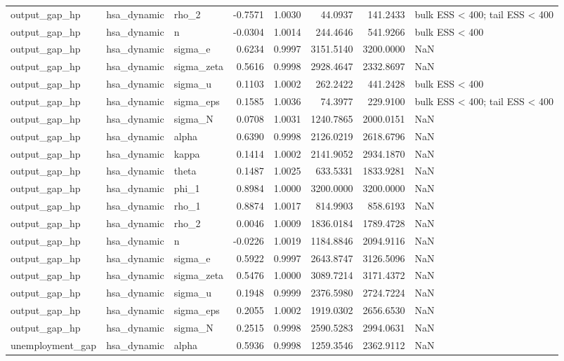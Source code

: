 \begin{tabular}{lllrrrrl}
output\_gap\_hp & hsa\_dynamic & rho\_2 & -0.7571 & 1.0030 & 44.0937 & 141.2433 & bulk ESS < 400; tail ESS < 400 \\
output\_gap\_hp & hsa\_dynamic & n & -0.0304 & 1.0014 & 244.4646 & 541.9266 & bulk ESS < 400 \\
output\_gap\_hp & hsa\_dynamic & sigma\_e & 0.6234 & 0.9997 & 3151.5140 & 3200.0000 & NaN \\
output\_gap\_hp & hsa\_dynamic & sigma\_zeta & 0.5616 & 0.9998 & 2928.4647 & 2332.8697 & NaN \\
output\_gap\_hp & hsa\_dynamic & sigma\_u & 0.1103 & 1.0002 & 262.2422 & 441.2428 & bulk ESS < 400 \\
output\_gap\_hp & hsa\_dynamic & sigma\_eps & 0.1585 & 1.0036 & 74.3977 & 229.9100 & bulk ESS < 400; tail ESS < 400 \\
output\_gap\_hp & hsa\_dynamic & sigma\_N & 0.0708 & 1.0031 & 1240.7865 & 2000.0151 & NaN \\
output\_gap\_hp & hsa\_dynamic & alpha & 0.6390 & 0.9998 & 2126.0219 & 2618.6796 & NaN \\
output\_gap\_hp & hsa\_dynamic & kappa & 0.1414 & 1.0002 & 2141.9052 & 2934.1870 & NaN \\
output\_gap\_hp & hsa\_dynamic & theta & 0.1487 & 1.0025 & 633.5331 & 1833.9281 & NaN \\
output\_gap\_hp & hsa\_dynamic & phi\_1 & 0.8984 & 1.0000 & 3200.0000 & 3200.0000 & NaN \\
output\_gap\_hp & hsa\_dynamic & rho\_1 & 0.8874 & 1.0017 & 814.9903 & 858.6193 & NaN \\
output\_gap\_hp & hsa\_dynamic & rho\_2 & 0.0046 & 1.0009 & 1836.0184 & 1789.4728 & NaN \\
output\_gap\_hp & hsa\_dynamic & n & -0.0226 & 1.0019 & 1184.8846 & 2094.9116 & NaN \\
output\_gap\_hp & hsa\_dynamic & sigma\_e & 0.5922 & 0.9997 & 2643.8747 & 3126.5096 & NaN \\
output\_gap\_hp & hsa\_dynamic & sigma\_zeta & 0.5476 & 1.0000 & 3089.7214 & 3171.4372 & NaN \\
output\_gap\_hp & hsa\_dynamic & sigma\_u & 0.1948 & 0.9999 & 2376.5980 & 2724.7224 & NaN \\
output\_gap\_hp & hsa\_dynamic & sigma\_eps & 0.2055 & 1.0002 & 1919.0302 & 2656.6530 & NaN \\
output\_gap\_hp & hsa\_dynamic & sigma\_N & 0.2515 & 0.9998 & 2590.5283 & 2994.0631 & NaN \\
unemployment\_gap & hsa\_dynamic & alpha & 0.5936 & 0.9998 & 1259.3546 & 2362.9112 & NaN \\

\end{tabular}
